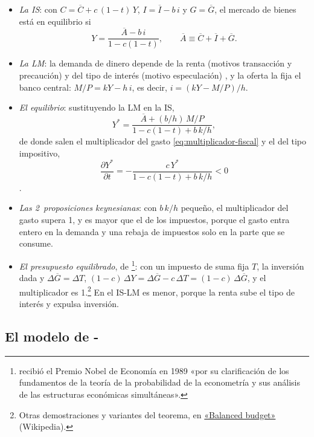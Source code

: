 \documentclass[11pt]{article}
\begin{document}
\begin{itemize}
\item \emph{La IS}: con $C=\overline{C}+c\,(1-t)\,Y$, $I=\overline{I}-b\,i$ y $G=\overline{G}$, el mercado de bienes está en equilibrio si
  \begin{equation*}
  Y=\frac{\overline{A}-b\,i}{1-c(1-t)},\qquad \overline{A}\equiv\overline{C}+\overline{I}+\overline{G}.
  \end{equation*}
\item \emph{La LM}: la demanda de dinero depende de la renta (motivos transacción y precaución) y del tipo de interés (motivo especulación) , y la oferta la fija el banco central: $M/P=kY-h\,i$, es decir, $i=(kY-M/P)/h$.
\item \emph{El equilibrio}: sustituyendo la LM en la IS,
  \begin{equation*}
  Y^*=\frac{\overline{A}+(b/h)\,M/P}{1-c(1-t)+b\,k/h},
  \end{equation*}
  de donde salen el multiplicador del gasto \eqref{eq:multiplicador-fiscal} y el del tipo impositivo,
  \begin{equation*}
  \frac{\partial Y^*}{\partial t}=-\frac{c\,Y^*}{1-c(1-t)+b\,k/h}<0
  \end{equation*}
  .
\item \emph{Las 2~proposiciones keynesianas}: con $b\,k/h$ pequeño, el multiplicador del gasto supera 1, y es mayor que el de los impuestos, porque el gasto entra entero en la demanda y una rebaja de impuestos solo en la parte que se consume.
\item \emph{El presupuesto equilibrado}, de \textcite{Haavelmo1945Multiplier}\footnote{ recibió el Premio Nobel de Economía en 1989 «por su clarificación de los fundamentos de la teoría de la probabilidad de la econometría y sus análisis de las estructuras económicas simultáneas»\nocite{Nobel1989Haavelmo}.}: con un impuesto de suma fija $T$, la inversión dada y $\Delta\overline{G}=\Delta T$, $(1-c)\,\Delta Y=\Delta\overline{G}-c\,\Delta T=(1-c)\,\Delta\overline{G}$, y el multiplicador es 1.\footnote{Otras demostraciones y variantes del teorema, en \href{https://en.wikipedia.org/wiki/Balanced_budget}{«Balanced budget»} (Wikipedia).} En el IS-LM es menor, porque la renta sube el tipo de interés y expulsa inversión.
\end{itemize}

\subsection{El modelo de -}
\end{document}
